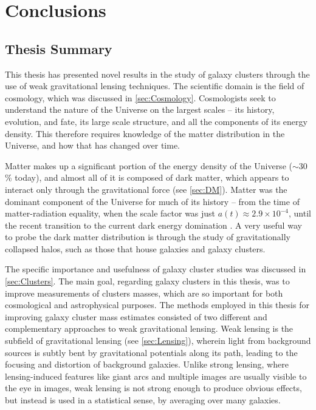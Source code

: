 
\chapter{Conclusions}
\label{ch:conc}


\section{Thesis Summary}
\label{sec:summary}

This thesis has presented novel results in the study of galaxy clusters through the use of weak gravitational lensing techniques. The scientific domain is the field of cosmology, which was discussed in \autoref{sec:Cosmology}. Cosmologists seek to understand the nature of the Universe on the largest scales -- its history, evolution, and fate, its large scale structure, and all the components of its energy density. This therefore requires knowledge of the matter distribution in the Universe, and how that has changed over time. 

Matter makes up a significant portion of the energy density of the Universe ($\sim30$\% today), and almost all of it is composed of dark matter, which appears to interact only through the gravitational force (see \autoref{sec:DM}). Matter was the dominant component of the Universe for much of its history -- from the time of matter-radiation equality, when the scale factor was just $a(t) \approx 2.9 \times 10^{-4}$, until the recent transition to the current dark energy domination \citep{PlanckXIII_15}. A very useful way to probe the dark matter distribution is through the study of gravitationally collapsed halos, such as those that house galaxies and galaxy clusters.

The specific importance and usefulness of galaxy cluster studies was discussed in \autoref{sec:Clusters}. The main goal, regarding galaxy clusters in this thesis, was to improve measurements of clusters masses, which are so important for both cosmological and astrophysical purposes. The methods employed in this thesis for improving galaxy cluster mass estimates consisted of two different and complementary approaches to weak gravitational lensing. Weak lensing is the subfield of gravitational lensing (see \autoref{sec:Lensing}), wherein light from background sources is subtly bent by gravitational potentials along its path, leading to the focusing and distortion of background galaxies. Unlike strong lensing, where lensing-induced features like giant arcs and multiple images are usually visible to the eye in images, weak lensing is not strong enough to produce obvious effects, but instead is used in a statistical sense, by averaging over many galaxies.

